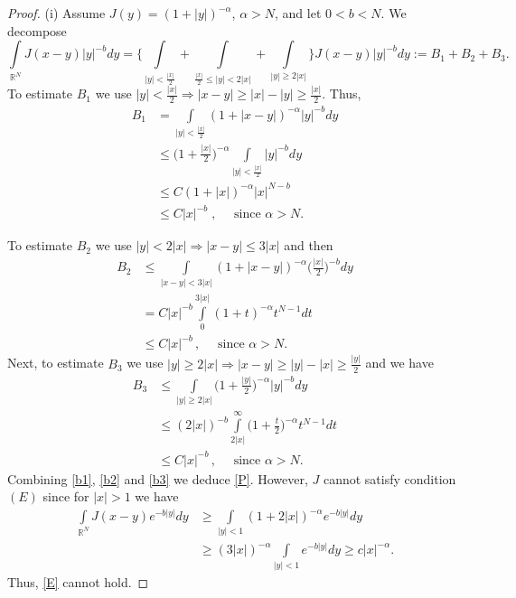 \documentclass[leqno,12pt]{article}
\newcommand{\intl}{\int\limits}
\newcommand{\R}{\mathbb R}
\numberwithin{equation}{section}
\begin{document}
\begin{proof}
(i) Assume $J(y)=(1+|y|)^{-\alpha}$, $\alpha>N$, and let $0<b<N$. We decompose
$$
\intl_{\R^N}J(x-y)|y|^{-b}dy=\Big\{\intl_{|y|<\frac{|x|}{2} }+\intl_{\frac{|x|}{2}\leq |y|<2|x| } + \intl_{|y|\geq 2|x|}  \Big\} J(x-y)|y|^{-b}dy := B_1+B_2+B_3.
$$
To estimate $B_1$ we use 
$
|y|<\frac{|x|}{2}\Longrightarrow |x-y|\geq |x|-|y|\geq \frac{|x|}{2}$.
Thus,
\begin{equation}\label{b1}
\begin{aligned}
B_1&=\intl_{|y|<\frac{|x|}{2} } (1+|x-y|)^{-\alpha} |y|^{-b}dy\\
&\leq \Big(1+\frac{|x|}{2}\Big)^{-\alpha} \intl_{|y|<\frac{|x|}{2} }  |y|^{-b}dy\\
&\leq C(1+|x|)^{-\alpha}|x|^{N-b}\\
&\leq C|x|^{-b}\; , \quad \mbox{ since }\alpha>N.
\end{aligned}
\end{equation}

To estimate $B_2$ we use 
$|y|<2|x| \Longrightarrow |x-y|\leq 3|x|$ and then 
\begin{equation}\label{b2}
\begin{aligned}
B_2&\leq \intl_{|x-y|<3 |x|} (1+|x-y|)^{-\alpha} \Big(\frac{|x|}{2}\Big)^{-b}dy\\
&=C |x|^{-b} \intl_0^{3|x|} (1+t)^{-\alpha} t^{N-1}dt\\
&\leq C |x|^{-b}\, , \quad \mbox{ since $\alpha>N$}.
\end{aligned}
\end{equation}
Next, to estimate $B_3$ we use 
$|y|\geq 2|x| \Longrightarrow |x-y|\geq |y|-|x|\geq \frac{|y|}{2}$ and we have
\begin{equation}\label{b3}
\begin{aligned}
B_3&\leq \intl_{|y|\geq 2 |x|} \Big(1+\frac{|y|}{2}\Big)^{-\alpha} |y|^{-b } dy\\
&\leq (2|x|)^{-b}  \intl_{2|x| }^\infty  \Big(1+\frac{t}{2}\Big)^{-\alpha} t^{N-1}dt\\
&\leq C |x|^{-b}\, , \quad \mbox{ since $\alpha>N$}.
\end{aligned}
\end{equation}
Combining \eqref{b1}, \eqref{b2} and \eqref{b3} we deduce \eqref{P}.
However, $J$ cannot satisfy condition $(E)$ since for $|x|>1$ we have
$$
\begin{aligned}
\intl_{\R^N}J(x-y)e^{-b|y|}dy & \geq \intl_{|y|<1}(1+2|x|)^{-\alpha} e^{-b|y|}dy\\
&\geq (3|x|)^{-\alpha} \intl_{|y|<1}  e^{-b|y|}dy \geq c|x|^{-\alpha}.
\end{aligned}
$$
Thus, \eqref{E} cannot hold.


\end{proof}
\end{document}
